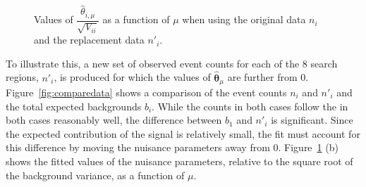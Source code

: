 \begin{figure}[hbt]
  \begin{center} 
   \caption{Values of $\dfrac{\hat{\theta}_{i,\mu}}{\sqrt{V_{ii}}}$ as a function of $\mu$ when using the original data $n_{i}$ and the replacement data $n'_{i}$.}
   \label{fig:nuisancevariation} 
  \end{center}
\end{figure}


To illustrate this, a new set of observed event counts for each of the 8 search regions, $n'_{i}$, is produced for which the values of 
$\hat{\boldsymbol{\theta}}_{\mu}$ are further from 0. Figure~\ref{fig:comparedata} shows a comparison of the event counts $n_{i}$ and 
$n'_{i}$ and the total expected backgrounds $b_{i}$. While the counts in both cases 
follow the in both cases reasonably well, the difference between $b_{1}$ and $n'_{i}$ is significant. Since the expected contribution of the signal 
is relatively small, the fit must account for this difference by moving the nuisance parameters away from 0. Figure~\ref{fig:nuisancevariation} (b) shows the fitted
values of the nuisance parameters, relative to the square root of the background variance, as a function of $\mu$.


